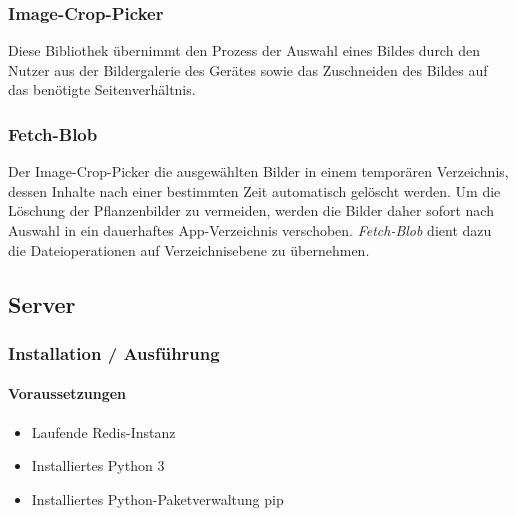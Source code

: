         \subsubsection*{Image-Crop-Picker}
        Diese Bibliothek übernimmt den Prozess der Auswahl eines Bildes durch den Nutzer aus der Bildergalerie des Gerätes sowie das Zuschneiden des Bildes auf das benötigte Seitenverhältnis.
        
        \subsubsection*{Fetch-Blob}
        Der Image-Crop-Picker die ausgewählten Bilder in einem temporären Verzeichnis, dessen Inhalte nach einer bestimmten Zeit automatisch gelöscht werden. Um die Löschung der Pflanzenbilder zu vermeiden, werden die Bilder daher sofort nach Auswahl in ein dauerhaftes App-Verzeichnis verschoben. \textit{Fetch-Blob} dient dazu die Dateioperationen auf Verzeichnisebene zu übernehmen. 

\subsection{Server}
    
    \subsubsection{Installation / Ausführung}
        \paragraph*{Voraussetzungen}
            \begin{itemize}
                \item Laufende Redis-Instanz
                \item Installiertes Python 3 
                \item Installiertes Python-Paketverwaltung pip
            \end{itemize}
        
